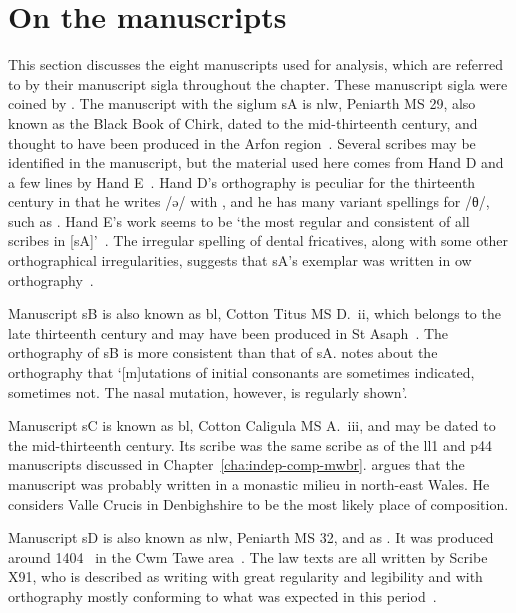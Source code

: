 \section{On the manuscripts}
\label{sec:manuscripts}
This section discusses the eight manuscripts used for analysis, which are referred to by their manuscript sigla throughout the chapter. These manuscript sigla were coined by \textcite{owen_ancient_1841}.
The manuscript with the siglum \gls{sA} is  \gls{nlw}, Peniarth MS 29, also known as the Black Book of Chirk, dated to the mid-thirteenth century, and thought to have been produced in the Arfon region~\autocite[171]{Rus_Scribal95}.
Several scribes may be identified in the manuscript, but the material used here comes from Hand D and a few lines by Hand E~\autocite[133--134]{Rus_Scribal95}.
Hand D's orthography is peculiar for the thirteenth century in that he writes /ə/ with , and he has many variant spellings for /θ/, such as .
Hand E's work seems to be `the most regular and consistent of all scribes in [\gls{sA}]'~\autocite[152]{Rus_Scribal95}.
The irregular spelling of dental fricatives, along with some other orthographical irregularities, suggests that \gls{sA}'s exemplar was written in \gls{ow} orthography~\autocite[169]{Rus_Scribal95}. 

Manuscript \gls{sB} is also known as \acrshort{bl}, Cotton Titus MS D.~ii, which belongs to the late thirteenth century and may have been produced in St Asaph~\autocite[v]{elias_golygiad_2007}. The orthography of \gls{sB} is more consistent than that of \gls{sA}. \Textcite[xlii]{wiliam_llyfr_1960} notes about the orthography that `[m]utations of initial consonants are sometimes indicated, sometimes not. The nasal mutation, however, is regularly shown'.

Manuscript \gls{sC} is known  as \gls{bl}, Cotton Caligula MS A.~iii, and may be dated to the mid-thirteenth century. Its scribe was the same scribe as of the \gls{ll1} and \gls{p44} manuscripts discussed in Chapter~\ref{cha:indep-comp-mwbr}. \Textcite[189]{huws_medieval_2000} argues that the manuscript was probably written in a monastic milieu in north-east Wales. He considers Valle Crucis in Denbighshire to be the most likely place of composition.

Manuscript \gls{sD} is also known as \gls{nlw}, Peniarth MS 32, and as . It was produced around 1404~\autocite[60]{huws_medieval_2000} in the Cwm Tawe area~\autocite[v]{elias_golygiad_2007}. The law texts are all written by Scribe X91, who is described as writing with great regularity and legibility and with orthography mostly conforming to what was expected in this period~\autocite{thomas_tei_2013}.

